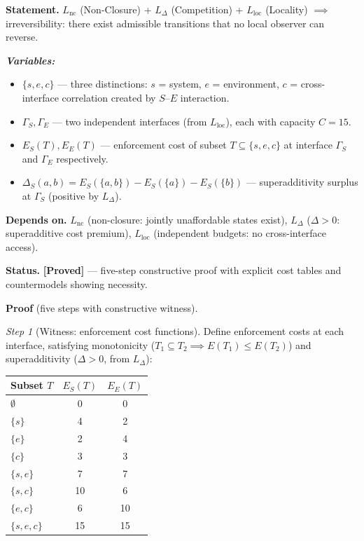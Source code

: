 \documentclass[11pt]{article}
\theoremstyle{remark}
\newenvironment{varlist}{\begin{itemize}[nosep,leftmargin=2em]}{\end{itemize}}
\begin{document}
\begin{tcolorbox}[apfbox, title={Lemma $L_{\mathrm{irr}}$ (Irreversibility)}]
\textbf{Statement.}  $L_{\mathrm{nc}}$ (Non-Closure) + $L_\Delta$ (Competition) + $L_{\mathrm{loc}}$ (Locality) $\implies$ irreversibility: there exist admissible transitions that no local observer can reverse.

\smallskip\noindent\textbf{\textit{Variables:}}
\begin{varlist}
\item $\{s, e, c\}$ --- three distinctions: $s$ = system, $e$ = environment, $c$ = cross-interface correlation created by $S$--$E$ interaction.
\item $\Gamma_S, \Gamma_E$ --- two independent interfaces (from $L_{\mathrm{loc}}$), each with capacity $C = 15$.
\item $E_S(T), E_E(T)$ --- enforcement cost of subset $T \subseteq \{s,e,c\}$ at interface $\Gamma_S$ and $\Gamma_E$ respectively.
\item $\Delta_S(a,b) = E_S(\{a,b\}) - E_S(\{a\}) - E_S(\{b\})$ --- superadditivity surplus at $\Gamma_S$ (positive by $L_\Delta$).
\end{varlist}

\smallskip\noindent\textbf{Depends on.}  $L_{\mathrm{nc}}$ (non-closure: jointly unaffordable states exist), $L_\Delta$ ($\Delta > 0$: superadditive cost premium), $L_{\mathrm{loc}}$ (independent budgets: no cross-interface access).

\smallskip\noindent\textbf{Status.}  \textbf{[Proved]} --- five-step constructive proof with explicit cost tables and countermodels showing necessity.

\smallskip\noindent\textbf{Proof} (five steps with constructive witness).

\textit{Step 1} (Witness: enforcement cost functions).  Define enforcement costs at each interface, satisfying monotonicity ($T_1 \subseteq T_2 \implies E(T_1) \le E(T_2)$) and superadditivity ($\Delta > 0$, from $L_\Delta$):

\begin{center}\small
\begin{tabular}{lcc}
\toprule
Subset $T$ & $E_S(T)$ & $E_E(T)$ \\
\midrule
$\emptyset$ & 0 & 0 \\
$\{s\}$ & 4 & 2 \\
$\{e\}$ & 2 & 4 \\
$\{c\}$ & 3 & 3 \\
$\{s,e\}$ & 7 & 7 \\
$\{s,c\}$ & 10 & 6 \\
$\{e,c\}$ & 6 & 10 \\
$\{s,e,c\}$ & 15 & 15 \\
\bottomrule
\end{tabular}
\end{center}


\end{tcolorbox}
\end{document}
